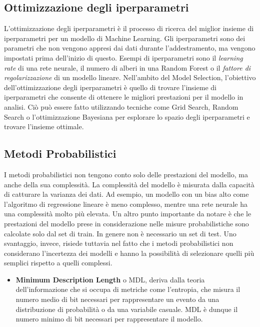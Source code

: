 \subsection{Ottimizzazione degli iperparametri}
L'ottimizzazione degli iperparametri è il processo di ricerca del miglior insieme di iperparametri per un modello di Machine Learning. Gli iperparametri sono dei parametri che non vengono appresi dai dati durante l'addestramento, ma vengono impostati prima dell'inizio di questo. Esempi di iperparametri sono il \textit{learning rate} di una rete neurale, il numero di alberi in una Random Forest o il \textit{fattore di regolarizzazione} di un modello lineare. Nell'ambito del Model Selection, l'obiettivo dell'ottimizzazione degli iperparametri è quello di trovare l'insieme di iperparametri che consente di ottenere le migliori prestazioni per il modello in analisi. Ciò può essere fatto utilizzando tecniche come Grid Search, Random Search o l'ottimizzazione Bayesiana per esplorare lo spazio degli iperparametri e trovare l'insieme ottimale.


\subsection{Metodi Probabilistici}
I metodi probabilistici non tengono conto solo delle prestazioni del modello, ma anche della sua complessità. La complessità del modello è misurata dalla capacità di catturare la varianza dei dati. 
Ad esempio, un modello con un bias alto come l'algoritmo di regressione lineare è meno complesso, mentre una rete neurale ha una complessità molto più elevata.
Un altro punto importante da notare è che le prestazioni del modello prese in considerazione nelle misure probabilistiche sono calcolate solo dal set di train. In genere non è necessario un set di test.
Uno svantaggio, invece, risiede tuttavia nel fatto che i metodi probabilistici non considerano l'incertezza dei modelli e hanno la possibilità di selezionare  quelli più semplici rispetto a quelli complessi.
\begin{itemize}
	\item \textbf{Minimum Description Length} o MDL, deriva dalla teoria dell'informazione che si occupa di metriche come l'entropia, che misura il numero medio di bit necessari per rappresentare un evento da una distribuzione di probabilità o da una variabile casuale. 
	      MDL è dunque il numero minimo di bit necessari per rappresentare il modello.
\end{itemize}

